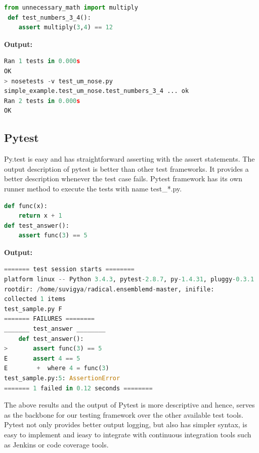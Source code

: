 \documentclass[10pt]{ruthesis}
\begin{document}
\begin{lstlisting}[language=Python]
from unnecessary_math import multiply
 def test_numbers_3_4():
    assert multiply(3,4) == 12 
\end{lstlisting}
\textbf{Output:}
\begin{lstlisting}[language=Python]
Ran 1 tests in 0.000s
OK
> nosetests -v test_um_nose.py
simple_example.test_um_nose.test_numbers_3_4 ... ok
Ran 2 tests in 0.000s
OK
\end{lstlisting}

\subsection{Pytest}
Py.test is easy and has straightforward asserting with the assert statements. The output description of pytest is better than other test frameworks. It provides a better description whenever the test case fails. Pytest framework has its own runner method to execute the tests with name test\_*.py.

\begin{lstlisting}[language=Python]
def func(x):
    return x + 1
def test_answer():
    assert func(3) == 5
\end{lstlisting}

\textbf{Output:}

\begin{lstlisting}[language=Python]
======= test session starts ========
platform linux -- Python 3.4.3, pytest-2.8.7, py-1.4.31, pluggy-0.3.1
rootdir: /home/suvigya/radical.ensemblemd-master, inifile:
collected 1 items
test_sample.py F
======= FAILURES ========
_______ test_answer ________
    def test_answer():
>       assert func(3) == 5
E       assert 4 == 5
E        +  where 4 = func(3)
test_sample.py:5: AssertionError
======= 1 failed in 0.12 seconds ========
\end{lstlisting}

The above results and the output of Pytest is more descriptive and hence, serves as the backbone for our testing framework over the other available test tools. Pytest not only provides better output logging, but also has simpler syntax, is easy to implement and ieasy to integrate with continuous integration tools such as Jenkins or code coverage tools.
\end{document}
